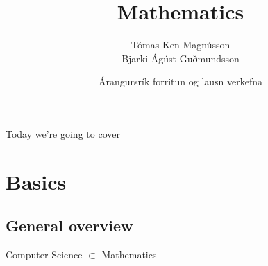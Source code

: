 \documentclass[12pt,t]{beamer}
\title{Mathematics}
\author{Tómas Ken Magnússon \\Bjarki Ágúst Guðmundsson}
\institute{\href{http://ru.is/td}{School of Computer Science} \\[2pt] \href{http://ru.is}{Reykjavík University}}
\date{Árangursrík forritun og lausn verkefna}
\newcommand{\bi}{\begin{itemize}}
\newcommand{\ei}{\end{itemize}}
\begin{document}
{
    \frame{
        \titlepage
    }
}

\begin{frame}{Today we're going to cover}
    \vspace{22pt}
    \tableofcontents[hideallsubsections]
\end{frame}

\section{Basics}
\subsection{General overview}

\begin{frame}%
  \vspace{60pt}
  \begin{center}
  Computer Science $\subset$ Mathematics
  \end{center}
\end{frame}
\end{document}
